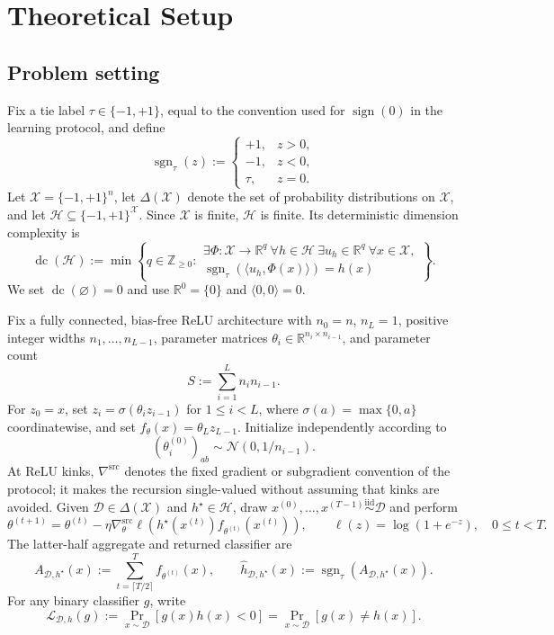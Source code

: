 \section{Theoretical Setup}
\label{sec:setup}

\subsection{Problem setting}

Fix a tie label $\tau\in\{-1,+1\}$, equal to the convention used for
$\operatorname{sign}(0)$ in the learning protocol, and define
\[
\operatorname{sgn}_{\tau}(z):=
\begin{cases}
+1,&z>0,\\
-1,&z<0,\\
\tau,&z=0.
\end{cases}
\]
Let $\mathcal X=\{-1,+1\}^n$, let $\Delta(\mathcal X)$ denote the set of
probability distributions on $\mathcal X$, and let
$\mathcal H\subseteq\{-1,+1\}^{\mathcal X}$.  Since $\mathcal X$ is
finite, $\mathcal H$ is finite.  Its deterministic dimension complexity is
\[
\operatorname{dc}(\mathcal H)
:=\min\left\{q\in\mathbb Z_{\geq0}:
\begin{array}{l}
\exists\Phi:\mathcal X\to\mathbb R^q\ \forall h\in\mathcal H\
\exists u_h\in\mathbb R^q\ \forall x\in\mathcal X,\\[1mm]
\operatorname{sgn}_{\tau}(\langle u_h,\Phi(x)\rangle)=h(x)
\end{array}
\right\}.
\]
We set $\operatorname{dc}(\varnothing)=0$ and use
$\mathbb R^0=\{0\}$ and $\langle0,0\rangle=0$.

Fix a fully connected, bias-free ReLU architecture with $n_0=n$, $n_L=1$,
positive integer widths $n_1,\ldots,n_{L-1}$, parameter matrices
$\theta_i\in\mathbb R^{n_i\times n_{i-1}}$, and parameter count
\[
S:=\sum_{i=1}^{L}n_i n_{i-1}.
\]
For $z_0=x$, set $z_i=\sigma(\theta_i z_{i-1})$ for $1\leq i<L$, where
$\sigma(a)=\max\{0,a\}$ coordinatewise, and set
$f_\theta(x)=\theta_Lz_{L-1}$.  Initialize independently according to
\[
(\theta_i^{(0)})_{ab}\sim\mathcal N(0,1/n_{i-1}).
\]
At ReLU kinks, $\nabla^{\mathrm{src}}$ denotes the fixed gradient or
subgradient convention of the protocol; it makes the recursion single-valued
without assuming that kinks are avoided.  Given $\mathcal D\in\Delta(\mathcal
X)$ and $h^\star\in\mathcal H$, draw
$x^{(0)},\ldots,x^{(T-1)}\stackrel{\mathrm{iid}}{\sim}\mathcal D$ and perform
\[
\theta^{(t+1)}=\theta^{(t)}-
\eta\nabla^{\mathrm{src}}_\theta
\ell\!\left(h^\star(x^{(t)})f_{\theta^{(t)}}(x^{(t)})\right),
\qquad
\ell(z)=\log(1+e^{-z}),
\quad 0\leq t<T.
\]
The latter-half aggregate and returned classifier are
\[
A_{\mathcal D,h^\star}(x)
:=\sum_{t=\lceil T/2\rceil}^{T}f_{\theta^{(t)}}(x),
\qquad
\widehat h_{\mathcal D,h^\star}(x)
:=\operatorname{sgn}_{\tau}(A_{\mathcal D,h^\star}(x)).
\]
For any binary classifier $g$, write
\[
\mathcal L_{\mathcal D,h}(g)
:=\Pr_{x\sim\mathcal D}[g(x)h(x)<0]
=\Pr_{x\sim\mathcal D}[g(x)\neq h(x)].
\]

